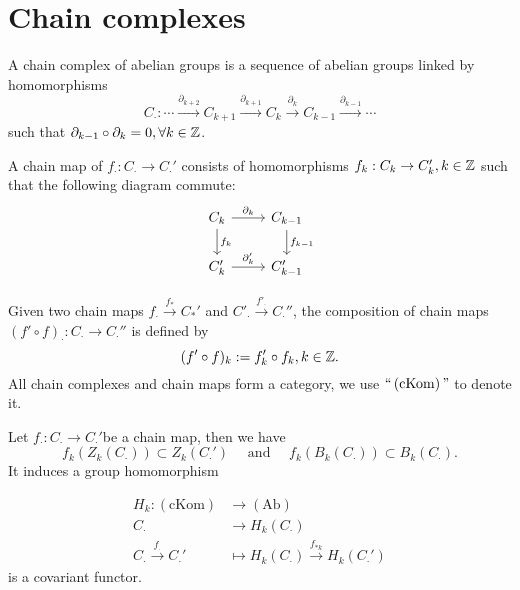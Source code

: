 \section{Chain complexes}
\begin{definition}
  A chain complex of abelian groups is a sequence of abelian groups linked by homomorphisms
  \[
    C_{\cdot }:\cdots\xrightarrow{\partial_{k+2}}C_{k+1}\xrightarrow{\partial_{k+1}}C_k\xrightarrow{\partial_k}C_{k-1}\xrightarrow{\partial_{k-1}}\cdots
  \] 
  such that $\partial_{k-1}\circ\partial_{k}=0,\forall k \in \mathbb{Z}$.

  A chain map of $f_{\cdot }:C_{\cdot }\to C_{\cdot }'$ consists of homomorphisms $f_k:C_k\to C_{k}',k\in \mathbb{Z}$ such that the following diagram commute:
  \[
  \begin{tikzcd}
    C_{k}\arrow{r}{\partial_k} \arrow{d}{f_k}  &C_{k-1} \arrow{d}{f_{k-1}} \\
    C'_{k}\arrow{r}{\partial_{k}'} & C_{k-1}'
  \end{tikzcd}
  \] 
\end{definition}

\begin{definition}
  Given two chain maps $f_{\cdot }\xrightarrow{f_{*}} C_{*}'$ and $C'_{\cdot }\xrightarrow{f'_{\cdot }} C_{\cdot }''$, the composition of chain maps $(f'\circ f)_{\cdot }:C_{\cdot }\to C_{\cdot }''$ is defined by 
  \[
    (f'\circ f)_{k}:=f'_k\circ f_k, k\in \mathbb{Z}.
  \] 
  All chain complexes and chain maps form a category, we use $``\left( \mathrm{cKom} \right) "$ to denote it.
\end{definition}

\begin{definition}
  Let $f_{\cdot }:C_{\cdot }\to C_{\cdot }'$be a chain map, then we have
  \[
    f_{k}(Z_k(C_{\cdot }))\subset Z_{k}(C_{\cdot }') \quad\text{ and }\quad f_{k}(B_k(C_{\cdot }))\subset B_{k}(C_{\cdot }).
  \]
  It induces a group homomorphism
\end{definition}
\begin{exercise}
  \begin{equation*}
    \begin{aligned}
      H_k:\mathrm{(cKom)} &\to  \mathrm{(Ab)}\\
      C_{\cdot }&\to H_{k}(C_{\cdot })\\
      C_{\cdot }\xrightarrow{f_{\cdot }}C_{\cdot }' & \mapsto  H_k(C_{\cdot })\xrightarrow{f_{*k}}H_k(C_{\cdot }')
    \end{aligned}
  \end{equation*}
  is a covariant functor.
\end{exercise}

